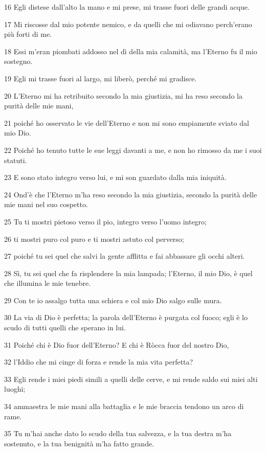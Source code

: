 \par 16 Egli distese dall'alto la mano e mi prese, mi trasse fuori delle grandi acque.
\par 17 Mi riscosse dal mio potente nemico, e da quelli che mi odiavano perch'erano più forti di me.
\par 18 Essi m'eran piombati addosso nel dì della mia calamità, ma l'Eterno fu il mio sostegno.
\par 19 Egli mi trasse fuori al largo, mi liberò, perché mi gradisce.
\par 20 L'Eterno mi ha retribuito secondo la mia giustizia, mi ha reso secondo la purità delle mie mani,
\par 21 poiché ho osservato le vie dell'Eterno e non mi sono empiamente sviato dal mio Dio.
\par 22 Poiché ho tenuto tutte le sue leggi davanti a me, e non ho rimosso da me i suoi statuti.
\par 23 E sono stato integro verso lui, e mi son guardato dalla mia iniquità.
\par 24 Ond'è che l'Eterno m'ha reso secondo la mia giustizia, secondo la purità delle mie mani nel suo cospetto.
\par 25 Tu ti mostri pietoso verso il pio, integro verso l'uomo integro;
\par 26 ti mostri puro col puro e ti mostri astuto col perverso;
\par 27 poiché tu sei quel che salvi la gente afflitta e fai abbassare gli occhi alteri.
\par 28 Sì, tu sei quel che fa risplendere la mia lampada; l'Eterno, il mio Dio, è quel che illumina le mie tenebre.
\par 29 Con te io assalgo tutta una schiera e col mio Dio salgo sulle mura.
\par 30 La via di Dio è perfetta; la parola dell'Eterno è purgata col fuoco; egli è lo scudo di tutti quelli che sperano in lui.
\par 31 Poiché chi è Dio fuor dell'Eterno? E chi è Ròcca fuor del nostro Dio,
\par 32 l'Iddio che mi cinge di forza e rende la mia vita perfetta?
\par 33 Egli rende i miei piedi simili a quelli delle cerve, e mi rende saldo sui miei alti luoghi;
\par 34 ammaestra le mie mani alla battaglia e le mie braccia tendono un arco di rame.
\par 35 Tu m'hai anche dato lo scudo della tua salvezza, e la tua destra m'ha sostenuto, e la tua benignità m'ha fatto grande.
